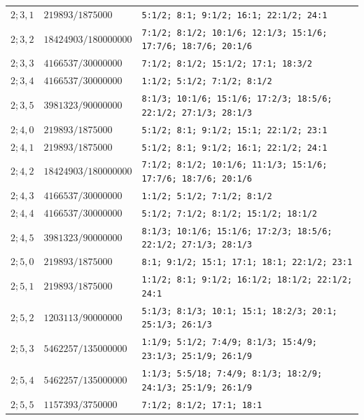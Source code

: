 \begin{longtable}{@{}p{}p{}p{}@{}}
$2;3,1$ & $219893/1875000$ & \texttt{5:1/2; 8:1; 9:1/2; 16:1; 22:1/2; 24:1} \\
$2;3,2$ & $18424903/180000000$ & \texttt{7:1/2; 8:1/2; 10:1/6; 12:1/3; 15:1/6; 17:7/6; 18:7/6; 20:1/6} \\
$2;3,3$ & $4166537/30000000$ & \texttt{7:1/2; 8:1/2; 15:1/2; 17:1; 18:3/2} \\
$2;3,4$ & $4166537/30000000$ & \texttt{1:1/2; 5:1/2; 7:1/2; 8:1/2} \\
$2;3,5$ & $3981323/90000000$ & \texttt{8:1/3; 10:1/6; 15:1/6; 17:2/3; 18:5/6; 22:1/2; 27:1/3; 28:1/3} \\
$2;4,0$ & $219893/1875000$ & \texttt{5:1/2; 8:1; 9:1/2; 15:1; 22:1/2; 23:1} \\
$2;4,1$ & $219893/1875000$ & \texttt{5:1/2; 8:1; 9:1/2; 16:1; 22:1/2; 24:1} \\
$2;4,2$ & $18424903/180000000$ & \texttt{7:1/2; 8:1/2; 10:1/6; 11:1/3; 15:1/6; 17:7/6; 18:7/6; 20:1/6} \\
$2;4,3$ & $4166537/30000000$ & \texttt{1:1/2; 5:1/2; 7:1/2; 8:1/2} \\
$2;4,4$ & $4166537/30000000$ & \texttt{5:1/2; 7:1/2; 8:1/2; 15:1/2; 18:1/2} \\
$2;4,5$ & $3981323/90000000$ & \texttt{8:1/3; 10:1/6; 15:1/6; 17:2/3; 18:5/6; 22:1/2; 27:1/3; 28:1/3} \\
$2;5,0$ & $219893/1875000$ & \texttt{8:1; 9:1/2; 15:1; 17:1; 18:1; 22:1/2; 23:1} \\
$2;5,1$ & $219893/1875000$ & \texttt{1:1/2; 8:1; 9:1/2; 16:1/2; 18:1/2; 22:1/2; 24:1} \\
$2;5,2$ & $1203113/90000000$ & \texttt{5:1/3; 8:1/3; 10:1; 15:1; 18:2/3; 20:1; 25:1/3; 26:1/3} \\
$2;5,3$ & $5462257/135000000$ & \texttt{1:1/9; 5:1/2; 7:4/9; 8:1/3; 15:4/9; 23:1/3; 25:1/9; 26:1/9} \\
$2;5,4$ & $5462257/135000000$ & \texttt{1:1/3; 5:5/18; 7:4/9; 8:1/3; 18:2/9; 24:1/3; 25:1/9; 26:1/9} \\
$2;5,5$ & $1157393/3750000$ & \texttt{7:1/2; 8:1/2; 17:1; 18:1} \\
\bottomrule
\end{longtable}
\setlength{\tabcolsep}{6pt}
\normalsize
